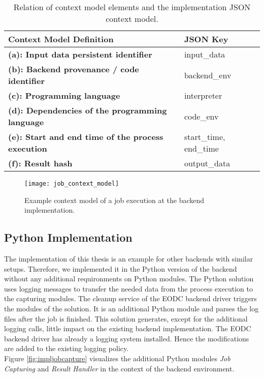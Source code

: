 \documentclass[draft,final]{vutinfth} %
\newcommand{\bgoesswein}[1]{{\color{blue}#1}}
\begin{document}
\begin{table}[]
	\caption{Relation of context model elements and the implementation JSON context model.}
	\begin{tabular}{l|l}
		\textbf{Context Model Definition} & \textbf{JSON Key} \\ \hline
		\textbf{(a): Input data persistent identifier} & input\_data \\ \hline
		\textbf{(b): Backend provenance / code identifier} & backend\_env \\ \hline
		\textbf{(c): Programming language} & interpreter \\ \hline
		\textbf{(d): Dependencies of the programming language} & code\_env \\ \hline
		\textbf{(e): Start and end time of the process execution} & start\_time, end\_time \\ \hline
		\textbf{(f): Result hash} & output\_data \\ %
	\end{tabular}
\label{Tab:contextmodel}
\end{table}

\begin{figure}[h]
	\centering
	\texttt{[image: job\_context\_model]}
	\caption{Example context model of a job execution at the backend implementation.}
	\label{fig:job_context_model} %
\end{figure}

\subsection{Python Implementation}\label{Implementation:Python Implementation}
The implementation of this thesis is an example for other backends with similar setups. Therefore, we implemented it in the Python version of the backend without any additional \bgoesswein{requironments on Python modules}. The Python solution uses logging messages to transfer the needed data from the process execution to the capturing modules. The cleanup service of the EODC backend driver triggers the modules of the solution. It is an additional Python module and parses the log files after the job is finished. This solution generates, except for the additional logging calls, little impact on the existing backend implementation. The EODC backend driver has already a logging system installed. Hence the modifications are added to the existing logging policy. \\
Figure \ref{fig:impljobcapture} visualizes the additional Python modules \textit{Job Capturing} and \textit{Result Handler} in the context of the backend environment. 
\end{document}
